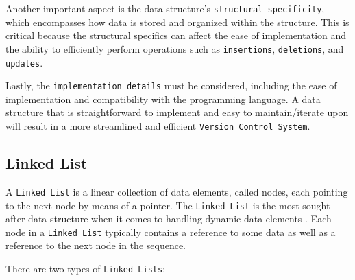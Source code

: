 Another important aspect is the data structure's \lstinline{structural specificity}, which encompasses how data is stored and organized within the structure. This is critical because the structural specifics can affect the ease of implementation and the ability to efficiently perform operations such as \lstinline{insertions}, \lstinline{deletions}, and \lstinline{updates}.

Lastly, the \lstinline{implementation details} must be considered, including the ease of implementation and compatibility with the programming language. A data structure that is straightforward to implement and easy to maintain/iterate upon will result in a more streamlined and efficient \lstinline{Version Control System}.


\subsection{Linked List}
A \lstinline{Linked List} is a linear collection of data elements, called nodes, each pointing to the next node by means of a pointer. The \lstinline{Linked List} is the most sought-after data structure when it comes to handling dynamic data elements \cite{ravikiran_2022}.
Each node in a \lstinline{Linked List} typically contains a reference to some data as well as a reference to the next node in the sequence.

There are two types of \lstinline{Linked Lists}:
